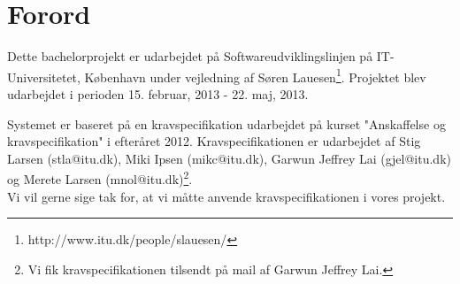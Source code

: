 \chapter{Forord}
\label{Preface}
Dette bachelorprojekt er udarbejdet på Softwareudviklingslinjen på IT-Universitetet, København under vejledning af Søren Lauesen\footnote{http://www.itu.dk/people/slauesen/}. Projektet blev udarbejdet i perioden 15. februar, 2013 - 22. maj, 2013.

Systemet er baseret på en kravspecifikation udarbejdet på kurset "Anskaffelse og kravspecifikation" i efteråret 2012. Kravspecifikationen er udarbejdet af Stig Larsen (stla@itu.dk), Miki Ipsen (mikc@itu.dk), Garwun Jeffrey Lai (gjel@itu.dk) og Merete Larsen (mnol@itu.dk)\footnote{Vi fik kravspecifikationen tilsendt på mail af Garwun Jeffrey Lai.}.
\\Vi vil gerne sige tak for, at vi måtte anvende kravspecifikationen i vores projekt.